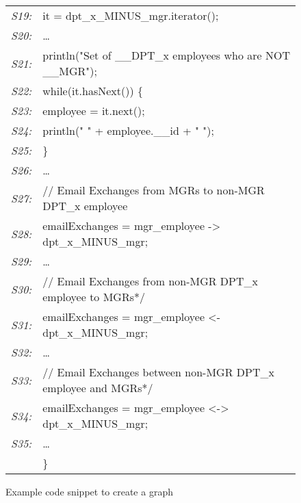\begin{figure}
\begin{center}
{\begin{tabular}[b]{rl}
          {\em \scriptsize S19:}&  \quad it = dpt\_x\_MINUS\_mgr.iterator(); \\
          {\em \scriptsize S20:}&  \quad    \ldots \\
          {\em \scriptsize S21:}&  \quad println("Set of \_\_DPT\_x employees 
          who are NOT  \_\_MGR"); \\
          {\em \scriptsize S22:}&  \quad while(it.hasNext()) \{\\
          {\em \scriptsize S23:}&  \quad \quad employee = it.next();\\
          {\em \scriptsize S24:}&  \quad \quad println(" " + employee.\_\_id + " 
          ");\\
          {\em \scriptsize S25:}&  \quad \}  \\
          {\em \scriptsize S26:}&  \quad  \ldots \\
          {\em \scriptsize S27:}&  \quad // Email Exchanges from MGRs to non-MGR 
          DPT\_x employee \\
          {\em \scriptsize S28:}&  \quad emailExchanges = mgr\_employee -> 
          dpt\_x\_MINUS\_mgr;\\
          {\em \scriptsize S29:}&  \quad  \ldots \\
          {\em \scriptsize S30:}&  \quad // Email Exchanges from non-MGR DPT\_x 
          employee to MGRs*/\\
          {\em \scriptsize S31:}&  \quad emailExchanges = mgr\_employee <- 
          dpt\_x\_MINUS\_mgr;\\
          {\em \scriptsize S32:}&  \quad  \ldots \\
          {\em \scriptsize S33:}&  \quad // Email Exchanges between non-MGR 
          DPT\_x employee and MGRs*/\\
          {\em \scriptsize S34:}&  \quad emailExchanges = mgr\_employee <-> 
          dpt\_x\_MINUS\_mgr;\\
          {\em \scriptsize S35:}&  \quad  \ldots \\
          &\}
        \end{tabular}
      }
\end{center}
  \caption{Example code snippet to create a graph}
  \label{fig:motiv_3}
\end{figure}

